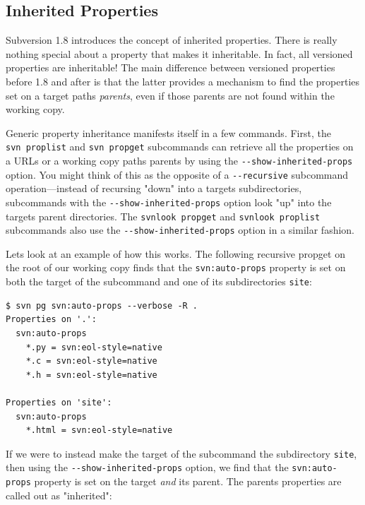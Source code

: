 \subsection{Inherited Properties}\label{svn.advanced.props.inheritable}

Subversion 1.8 introduces the concept of inherited properties. There is
really nothing special about a property that makes it inheritable. In
fact, all versioned properties are inheritable! The main difference
between versioned properties before 1.8 and after is that the latter
provides a mechanism to find the properties set on a target
path\textquotesingle s \emph{parents}, even if those parents are not
found within the working copy.

Generic property inheritance manifests itself in a few commands. First,
the \texttt{svn\ proplist} and \texttt{svn\ propget} subcommands can
retrieve all the properties on a URL\textquotesingle s or a working copy
path\textquotesingle s parents by using the
\texttt{-\/-show-inherited-props} option. You might think of this as the
opposite of a \texttt{-\/-recursive} subcommand operation---instead of
recursing "down" into a target\textquotesingle s subdirectories,
subcommands with the \texttt{-\/-show-inherited-props} option look "up"
into the target\textquotesingle s parent directories. The
\texttt{svnlook\ propget} and \texttt{svnlook\ proplist} subcommands
also use the \texttt{-\/-show-inherited-props} option in a similar
fashion.

Let\textquotesingle s look at an example of how this works. The
following recursive propget on the root of our working copy finds that
the \texttt{svn:auto-props} property is set on both the target of the
subcommand and one of its subdirectories \texttt{site}:

\begin{verbatim}
$ svn pg svn:auto-props --verbose -R .
Properties on '.':
  svn:auto-props
    *.py = svn:eol-style=native
    *.c = svn:eol-style=native
    *.h = svn:eol-style=native

Properties on 'site':
  svn:auto-props
    *.html = svn:eol-style=native
\end{verbatim}

If we were to instead make the target of the subcommand the subdirectory
\texttt{site}, then using the \texttt{-\/-show-inherited-props} option,
we find that the \texttt{svn:auto-props} property is set on the target
\emph{and} its parent. The parent\textquotesingle s properties are
called out as "inherited":

